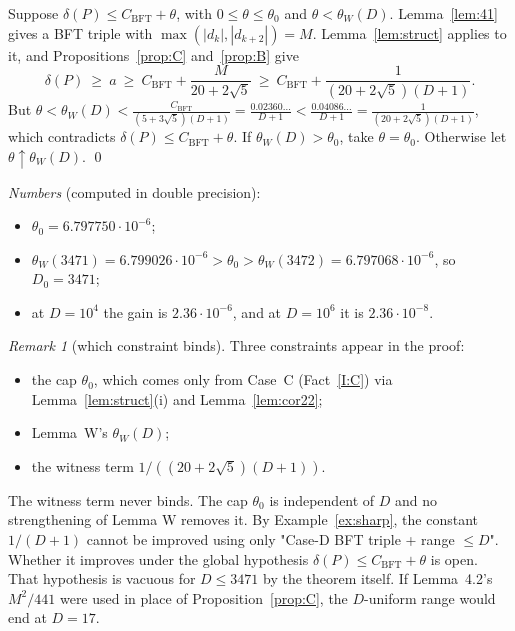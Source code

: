 \documentclass[10pt]{amsart}
\theoremstyle{definition}
\theoremstyle{remark}
\newtheorem{remark}[theorem]{Remark}
\newcommand{\CB}{C_{\mathrm{BFT}}}
\newcommand{\tW}{\theta_W}
\begin{document}
Suppose $\delta(P)\le\CB+\theta$, with $0\le\theta\le\theta_0$ and $\theta<\tW(D)$.
Lemma~\ref{lem:41} gives a BFT triple with $\max(|d_k|,|d_{k+2}|)=M$.
Lemma~\ref{lem:struct} applies to it, and Propositions~\ref{prop:C} and~\ref{prop:B} give
\[
\delta(P)\ \ge\ a\ \ge\ \CB+\frac{M}{20+2\sqrt5}\ \ge\ \CB+\frac{1}{(20+2\sqrt5)(D+1)} .
\]
But $\theta<\tW(D)<\frac{\CB}{(5+3\sqrt5)(D+1)}=\frac{0.02360\ldots}{D+1}<\frac{0.04086\ldots}{D+1}=\frac1{(20+2\sqrt5)(D+1)}$, which contradicts $\delta(P)\le\CB+\theta$.
If $\tW(D)>\theta_0$, take $\theta=\theta_0$. Otherwise let $\theta\uparrow\tW(D)$. \qed

\medskip
\noindent\emph{Numbers} (computed in double precision):
\begin{itemize}
\item $\theta_0=6.797750\cdot10^{-6}$;
\item $\tW(3471)=6.799026\cdot10^{-6}>\theta_0>\tW(3472)=6.797068\cdot10^{-6}$, so $D_0=3471$;
\item at $D=10^4$ the gain is $2.36\cdot10^{-6}$, and at $D=10^6$ it is $2.36\cdot10^{-8}$.
\end{itemize}

\begin{remark}[which constraint binds]
Three constraints appear in the proof:
\begin{itemize}
\item the cap $\theta_0$, which comes only from Case~C (Fact~\ref{I:C}) via Lemma~\ref{lem:struct}(i) and Lemma~\ref{lem:cor22};
\item Lemma~W's $\tW(D)$;
\item the witness term $1/((20+2\sqrt5)(D+1))$.
\end{itemize}
The witness term never binds. The cap $\theta_0$ is independent of $D$ and no strengthening of Lemma W removes it.
By Example~\ref{ex:sharp}, the constant $1/(D+1)$ cannot be improved using only "Case-D BFT triple + range $\le D$". Whether it improves under the global hypothesis $\delta(P)\le\CB+\theta$ is open. That hypothesis is vacuous for $D\le3471$ by the theorem itself.
If Lemma~4.2's $M^2/441$ were used in place of Proposition~\ref{prop:C}, the $D$-uniform range would end at $D=17$.
\end{remark}
\end{document}
